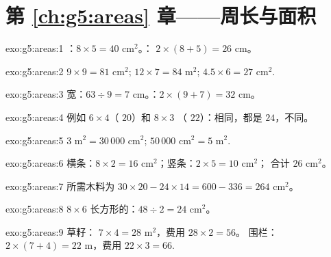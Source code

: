 \section*{第 \ref{ch:g5:areas} 章——周长与面积}

\begin{solution}{exo:g5:areas:1}
：$8 \times 5 = 40$ cm$^2$。：
$2 \times (8 + 5) = 26$ cm。
\end{solution}

\begin{solution}{exo:g5:areas:2}
$9 \times 9 = 81$ cm$^2$; \quad $12 \times 7 = 84$ m$^2$; \quad
$4.5 \times 6 = 27$ cm$^2$.
\end{solution}

\begin{solution}{exo:g5:areas:3}
宽：$63 \div 9 = 7$ cm。：$2 \times (9 + 7) = 32$ cm。
\end{solution}

\begin{solution}{exo:g5:areas:4}
例如 $6 \times 4$（ $20$）和 $8 \times 3$
（ $22$）：相同，都是 $24$，不同。
\end{solution}

\begin{solution}{exo:g5:areas:5}
$3$ m$^2 = 30\,000$ cm$^2$; \quad $50\,000$ cm$^2 = 5$ m$^2$.
\end{solution}

\begin{solution}{exo:g5:areas:6}
横条：$8 \times 2 = 16$ cm$^2$；竖条：$2 \times 5 = 10$ cm$^2$；
合计 $26$ cm$^2$。
\end{solution}

\begin{solution}{exo:g5:areas:7}
所需木料为 $30 \times 20 - 24 \times 14 = 600 - 336 = 264$ cm$^2$。
\end{solution}

\begin{solution}{exo:g5:areas:8}
$8 \times 6$ 长方形的：$48 \div 2 = 24$ cm$^2$。
\end{solution}

\begin{solution}{exo:g5:areas:9}
草籽： $7 \times 4 = 28$ m$^2$，费用 $28 \times 2 = 56$。
围栏： $2 \times (7 + 4) = 22$ m，费用
$22 \times 3 = 66$.
\end{solution}

